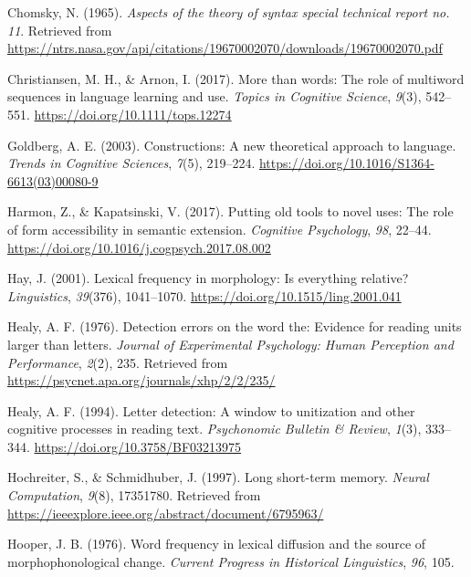 \documentclass[
  man,floatsintext]{apa6}
\newlength{\cslhangindent}
\newenvironment{CSLReferences}[2] %
 {\begin{list}{}{%
  \setlength{\itemindent}{0pt}
  \setlength{\leftmargin}{0pt}
  \setlength{\parsep}{0pt}
  \ifodd #1
   \setlength{\leftmargin}{\cslhangindent}
   \setlength{\itemindent}{-1\cslhangindent}
  \fi
  \setlength{\itemsep}{#2\baselineskip}}}
 {\end{list}}
\begin{document}
\begin{CSLReferences}{1}{0}
Chomsky, N. (1965). \emph{Aspects of the theory of syntax special technical report no. 11}. Retrieved from \url{https://ntrs.nasa.gov/api/citations/19670002070/downloads/19670002070.pdf}

Christiansen, M. H., \& Arnon, I. (2017). More than words: The role of multiword sequences in language learning and use. \emph{Topics in Cognitive Science}, \emph{9}(3), 542--551. \url{https://doi.org/10.1111/tops.12274}

Goldberg, A. E. (2003). Constructions: A new theoretical approach to language. \emph{Trends in Cognitive Sciences}, \emph{7}(5), 219--224. \url{https://doi.org/10.1016/S1364-6613(03)00080-9}

Harmon, Z., \& Kapatsinski, V. (2017). Putting old tools to novel uses: The role of form accessibility in semantic extension. \emph{Cognitive Psychology}, \emph{98}, 22--44. \url{https://doi.org/10.1016/j.cogpsych.2017.08.002}

Hay, J. (2001). Lexical frequency in morphology: Is everything relative? \emph{Linguistics}, \emph{39}(376), 1041--1070. \url{https://doi.org/10.1515/ling.2001.041}

Healy, A. F. (1976). Detection errors on the word the: Evidence for reading units larger than letters. \emph{Journal of Experimental Psychology: Human Perception and Performance}, \emph{2}(2), 235. Retrieved from \url{https://psycnet.apa.org/journals/xhp/2/2/235/}

Healy, A. F. (1994). Letter detection: A window to unitization and other cognitive processes in reading text. \emph{Psychonomic Bulletin \& Review}, \emph{1}(3), 333--344. \url{https://doi.org/10.3758/BF03213975}

Hochreiter, S., \& Schmidhuber, J. (1997). Long short-term memory. \emph{Neural Computation}, \emph{9}(8), 17351780. Retrieved from \url{https://ieeexplore.ieee.org/abstract/document/6795963/}

Hooper, J. B. (1976). Word frequency in lexical diffusion and the source of morphophonological change. \emph{Current Progress in Historical Linguistics}, \emph{96}, 105.


\end{CSLReferences}
\end{document}
